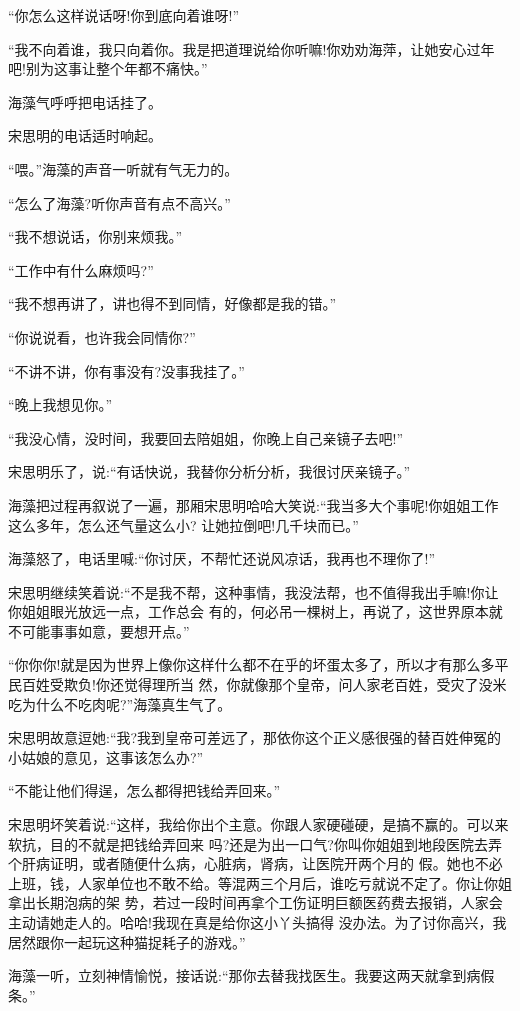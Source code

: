 \documentclass[11pt,a4paper,onecolumn]{article}
\begin{document}
``你怎么这样说话呀!你到底向着谁呀!''

``我不向着谁，我只向着你。我是把道理说给你听嘛!你劝劝海萍，让她安心过年吧!别为这事让整个年都不痛快。''

海藻气呼呼把电话挂了。

宋思明的电话适时响起。

``喂。''海藻的声音一听就有气无力的。

``怎么了海藻?听你声音有点不高兴。''

``我不想说话，你别来烦我。''

``工作中有什么麻烦吗?''

``我不想再讲了，讲也得不到同情，好像都是我的错。''

``你说说看，也许我会同情你?''

``不讲不讲，你有事没有?没事我挂了。''

``晚上我想见你。''

``我没心情，没时间，我要回去陪姐姐，你晚上自己亲镜子去吧!''

宋思明乐了，说:``有话快说，我替你分析分析，我很讨厌亲镜子。''

海藻把过程再叙说了一遍，那厢宋思明哈哈大笑说:``我当多大个事呢!你姐姐工作这么多年，怎么还气量这么小?
让她拉倒吧!几千块而已。''

海藻怒了，电话里喊:``你讨厌，不帮忙还说风凉话，我再也不理你了!''

宋思明继续笑着说:``不是我不帮，这种事情，我没法帮，也不值得我出手嘛!你让你姐姐眼光放远一点，工作总会
有的，何必吊一棵树上，再说了，这世界原本就不可能事事如意，要想开点。''

``你你你!就是因为世界上像你这样什么都不在乎的坏蛋太多了，所以才有那么多平民百姓受欺负!你还觉得理所当
然，你就像那个皇帝，问人家老百姓，受灾了没米吃为什么不吃肉呢?''海藻真生气了。

宋思明故意逗她:``我?我到皇帝可差远了，那依你这个正义感很强的替百姓伸冤的小姑娘的意见，这事该怎么办?''

``不能让他们得逞，怎么都得把钱给弄回来。''

宋思明坏笑着说:``这样，我给你出个主意。你跟人家硬碰硬，是搞不赢的。可以来软抗，目的不就是把钱给弄回来
吗?还是为出一口气?你叫你姐姐到地段医院去弄个肝病证明，或者随便什么病，心脏病，肾病，让医院开两个月的
假。她也不必上班，钱，人家单位也不敢不给。等混两三个月后，谁吃亏就说不定了。你让你姐拿出长期泡病的架
势，若过一段时间再拿个工伤证明巨额医药费去报销，人家会主动请她走人的。哈哈!我现在真是给你这小丫头搞得
没办法。为了讨你高兴，我居然跟你一起玩这种猫捉耗子的游戏。''

海藻一听，立刻神情愉悦，接话说:``那你去替我找医生。我要这两天就拿到病假条。''
\end{document}
